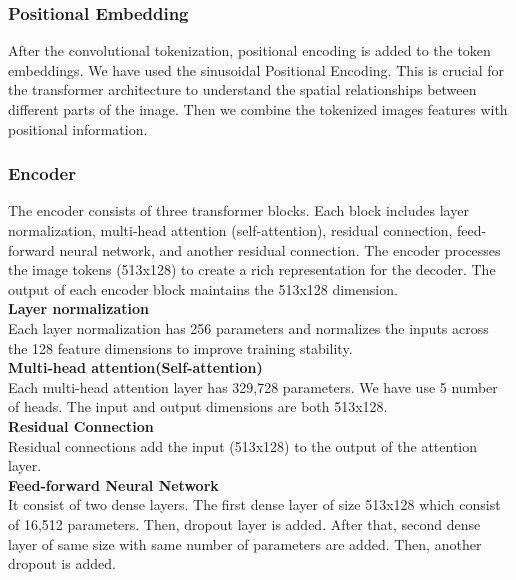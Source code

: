 \documentclass{ioereport}
\begin{document}
\subsubsection{Positional Embedding}
After the convolutional tokenization, positional encoding is added to the token
embeddings. We have used the sinusoidal Positional Encoding. This is crucial for the
transformer architecture to understand the spatial relationships between different parts
of the image. Then we combine the tokenized images features with positional
information.
\subsubsection{Encoder}
The encoder consists of three transformer blocks. Each block includes 
layer normalization, multi-head attention (self-attention), residual connection,
feed-forward neural network, and another residual connection. The encoder processes
 the image tokens (513x128) to create a rich representation for the decoder. The output of each
encoder block maintains the 513x128 dimension.\\
\textbf{Layer normalization}\\
Each layer normalization has 256 parameters and normalizes the inputs across the 128
feature dimensions to improve training stability.\\
\textbf{Multi-head attention(Self-attention)}\\
Each multi-head attention layer has 329,728 parameters. We have use 5 number of
heads. The input and output dimensions are both 513x128.\\
\textbf{Residual Connection}\\
Residual connections add the input (513x128) to the output of the attention layer.\\
\textbf{Feed-forward Neural Network}\\
It consist of two dense layers. The first dense layer of size 513x128 which consist of
16,512 parameters. Then, dropout layer is added. After that, second dense layer of same
size with same number of parameters are added. Then, another dropout is added.
\end{document}
